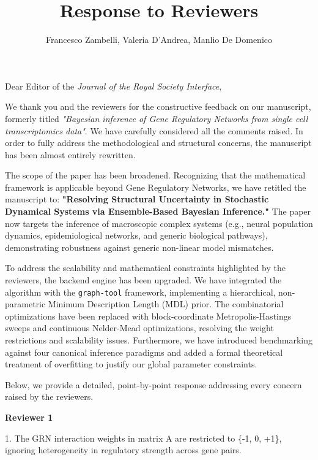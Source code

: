 \documentclass[11pt,a4paper]{article}
\title{Response to Reviewers}
\author{Francesco Zambelli, Valeria D'Andrea, Manlio De Domenico}
\date{}
\newcommand{\reviewer}[1]{\vspace{1.5em}\noindent\textbf{\Large #1}\vspace{0.5em}}
\begin{document}
\maketitle

\noindent Dear Editor of the \textit{Journal of the Royal Society Interface},

\vspace{1em}
We thank you and the reviewers for the constructive feedback on our manuscript, formerly titled \textit{"Bayesian inference of Gene Regulatory Networks from single cell transcriptomics data"}. We have carefully considered all the comments raised. In order to fully address the methodological and structural concerns, the manuscript has been almost entirely rewritten.

The scope of the paper has been broadened. Recognizing that the mathematical framework is applicable beyond Gene Regulatory Networks, we have retitled the manuscript to: \textbf{"Resolving Structural Uncertainty in Stochastic Dynamical Systems via Ensemble-Based Bayesian Inference."} The paper now targets the inference of macroscopic complex systems (e.g., neural population dynamics, epidemiological networks, and generic biological pathways), demonstrating robustness against generic non-linear model mismatches.

To address the scalability and mathematical constraints highlighted by the reviewers, the backend engine has been upgraded. We have integrated the algorithm with the \texttt{graph-tool} framework, implementing a hierarchical, non-parametric Minimum Description Length (MDL) prior. The combinatorial optimizations have been replaced with block-coordinate Metropolis-Hastings sweeps and continuous Nelder-Mead optimizations, resolving the weight restrictions and scalability issues. Furthermore, we have introduced benchmarking against four canonical inference paradigms and added a formal theoretical treatment of overfitting to justify our global parameter constraints.

Below, we provide a detailed, point-by-point response addressing every concern raised by the reviewers.

\vspace{1em}
\hrulefill

\reviewer{Reviewer 1}

\begin{reviewercomment}
1. The GRN interaction weights in matrix A are restricted to \{-1, 0, +1\}, ignoring heterogeneity in regulatory strength across gene pairs.
\end{reviewercomment}
\end{document}
